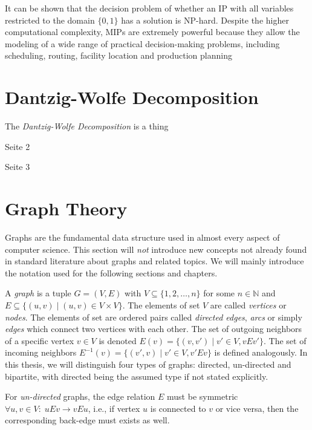 			It can be shown that the decision problem of whether an \acl{IP} with all variables restricted to the domain $\{ 0, 1 \}$ has a solution is NP-hard.
			Despite the higher computational complexity, MIPs are extremely powerful because they allow the modeling of a wide range of practical decision-making problems, including scheduling, routing, facility location and production planning
	
			\clearpage		
	
	\section{Dantzig-Wolfe Decomposition}
	
		The \textit{Dantzig-Wolfe Decomposition} is a thing
		
		\clearpage
		
		Seite 2
		
		\clearpage
		
		Seite 3
	
		\clearpage
	
	\section{Graph Theory}
	
		Graphs are the fundamental data structure used in almost every aspect of computer science.
		This section will \textit{not} introduce new concepts not already found in standard literature about graphs and related topics.
		We will mainly introduce the notation used for the following sections and chapters.
	
		A \textit{graph} is a tuple $G = (V, E)$ with $V \subseteq \{ 1, 2, \ldots, n \}$ for some $n \in \mathbb{N}$ and $E \subseteq \{ (u, v) \mid (u, v) \in V \times V \}$. The elements of set $V$ are called \textit{vertices} or \textit{nodes}.
		The elements of set are ordered pairs called \textit{directed edges}, \textit{arcs} or simply \textit{edges} which connect two vertices with each other.
		The set of outgoing neighbors of a specific vertex $v \in V$ is denoted $E(v) = \{ (v, v') \; | \; v' \in V, vEv' \}$. 
		The set of incoming neighbors $E^{-1}(v) = \{ (v', v) \; | \; v' \in V, v'Ev \}$ is defined analogously.
		In this thesis, we will distinguish four types of graphs: directed, un-directed and bipartite, with directed being the assumed type if not stated explicitly.
		
		For \textit{un-directed} graphs, the edge relation $E$ must be symmetric $\forall u,v \in V: \; uEv \xrightarrow{} vEu$, i.e., if vertex $u$ is connected to $v$ or vice versa, then the corresponding back-edge must exists as well.
		
